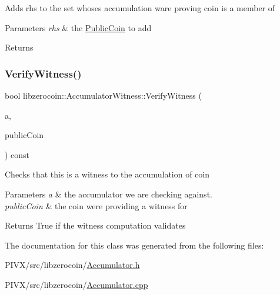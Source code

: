 Adds rhs to the set whose\textquotesingle{}s accumulation ware proving coin is a member of 
\begin{DoxyParams}{Parameters}
{\em rhs} & the \mbox{\hyperlink{classlibzerocoin_1_1_public_coin}{Public\+Coin}} to add \\
\hline
\end{DoxyParams}
\begin{DoxyReturn}{Returns}

\end{DoxyReturn}
\mbox{\label{classlibzerocoin_1_1_accumulator_witness_a76ce479fd510ed04d78c821cdb2a37bd}} 
\subsubsection{\texorpdfstring{Verify\+Witness()}{VerifyWitness()}}
{\footnotesize\ttfamily bool libzerocoin\+::\+Accumulator\+Witness\+::\+Verify\+Witness (\begin{DoxyParamCaption}\item[{const \mbox{\hyperlink{classlibzerocoin_1_1_accumulator}{Accumulator}} \&}]{a,  }\item[{const \mbox{\hyperlink{classlibzerocoin_1_1_public_coin}{Public\+Coin}} \&}]{public\+Coin }\end{DoxyParamCaption}) const}

Checks that this is a witness to the accumulation of coin 
\begin{DoxyParams}{Parameters}
{\em a} & the accumulator we are checking against. \\
\hline
{\em public\+Coin} & the coin we\textquotesingle{}re providing a witness for \\
\hline
\end{DoxyParams}
\begin{DoxyReturn}{Returns}
True if the witness computation validates 
\end{DoxyReturn}


The documentation for this class was generated from the following files\+:\begin{DoxyCompactItemize}
\item 
P\+I\+V\+X/src/libzerocoin/\mbox{\hyperlink{_accumulator_8h}{Accumulator.\+h}}\item 
P\+I\+V\+X/src/libzerocoin/\mbox{\hyperlink{_accumulator_8cpp}{Accumulator.\+cpp}}\end{DoxyCompactItemize}
